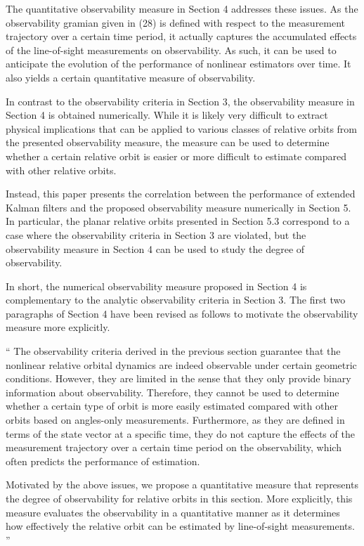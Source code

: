 \documentclass[11pt]{article}
\newenvironment{correction}{\begin{list}{}{\setlength{\leftmargin}{1cm}\setlength{\rightmargin}{1cm}}\vspace{\parsep}\item[]``}{''\end{list}}
\begin{document}
\begin{itemize}
The quantitative observability measure in Section 4 addresses these issues. As the observability gramian given in (28) is defined with respect to the measurement trajectory over a certain time period, it actually captures the accumulated effects of the line-of-sight measurements on observability. As such, it can be used to anticipate the evolution of the performance of nonlinear estimators over time. It also yields a certain quantitative measure of observability.

In contrast to the observability criteria in Section 3, the observability measure in Section 4 is obtained numerically.  While it is likely very difficult to extract physical implications that can be applied to various classes of relative orbits from the presented observability measure, the measure can be used to determine whether a certain relative orbit is easier or more difficult to estimate compared with other relative orbits.

Instead, this paper presents the correlation between the performance of extended Kalman filters and the proposed observability measure numerically in Section 5. In particular, the planar relative orbits presented in Section 5.3 correspond to a case where the observability criteria in Section 3 are violated, but the observability measure in Section 4 can be used to study the degree of observability. 

In short, the numerical observability measure proposed in Section 4 is complementary to the analytic observability criteria in Section 3. The first two paragraphs of Section 4 have been revised as follows to motivate the observability measure more explicitly.

\begin{correction}
The observability criteria derived in the previous section guarantee that the nonlinear relative orbital dynamics are indeed observable under certain geometric conditions. However, they are limited in the sense that they only provide binary information about observability. Therefore, they cannot be used to determine whether a certain type of orbit is more easily estimated compared with other orbits based on angles-only measurements. Furthermore, as they are defined in terms of the state vector at a specific time, they do not capture the effects of the measurement trajectory over a certain time period on the observability, which often predicts the performance of estimation.

Motivated by the above issues, we propose a quantitative measure that represents the degree of observability for relative orbits in this section. More explicitly, this measure evaluates the observability in a quantitative manner as it determines how effectively the relative orbit can be estimated by line-of-sight measurements. 
\end{correction}


\end{itemize}
\end{document}
